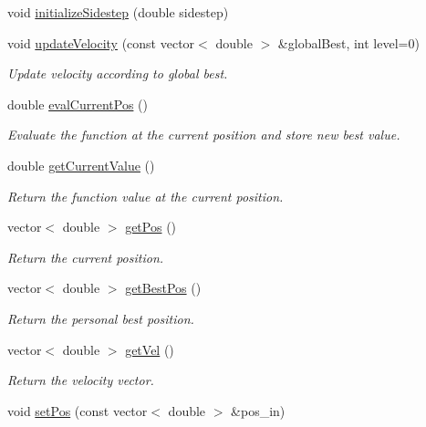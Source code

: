 \begin{CompactItemize}
void \hyperlink{classBird_618371d1ca2da9ff13657855dda09a85}{initializeSidestep} (double sidestep)
\item 
void \hyperlink{classBird_96328be626963fe73475a97290ffb54c}{updateVelocity} (const vector$<$ double $>$ \&globalBest, int level=0)
\begin{CompactList}\small\item\em Update velocity according to global best. \item\end{CompactList}\item 
double \hyperlink{classBird_1bd5c0e3711cd3aae93a0eeee0fd6c15}{evalCurrentPos} ()
\begin{CompactList}\small\item\em Evaluate the function at the current position and store new best value. \item\end{CompactList}\item 
double \hyperlink{classBird_bf844d57c7542b2bd8dba8d8aae84b96}{getCurrentValue} ()
\begin{CompactList}\small\item\em Return the function value at the current position. \item\end{CompactList}\item 
vector$<$ double $>$ \hyperlink{classBird_278525c49e07d167335c9fdfdcc4c16b}{getPos} ()
\begin{CompactList}\small\item\em Return the current position. \item\end{CompactList}\item 
vector$<$ double $>$ \hyperlink{classBird_ce844c5f8c4b379fcbf7dac32689d651}{getBestPos} ()
\begin{CompactList}\small\item\em Return the personal best position. \item\end{CompactList}\item 
vector$<$ double $>$ \hyperlink{classBird_9f7b66b52ae3579280e62bf8623d4917}{getVel} ()
\begin{CompactList}\small\item\em Return the velocity vector. \item\end{CompactList}\item 
void \hyperlink{classBird_c61ff0028ea7d5e664d7aa0ac4379012}{setPos} (const vector$<$ double $>$ \&pos\_\-in)

\end{CompactItemize}
